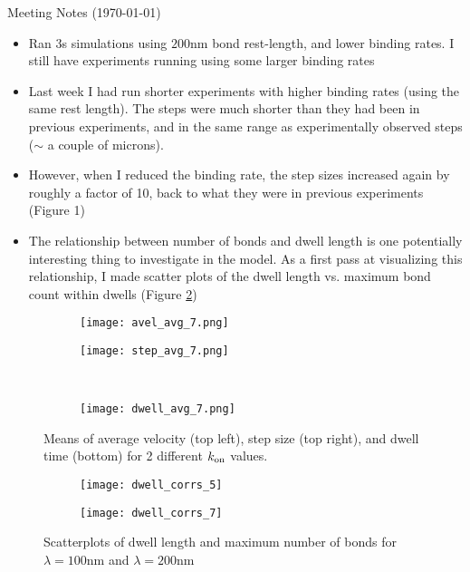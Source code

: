 \documentclass{article}
\newcommand{\tn}{\textnormal}
\begin{document}
\pagestyle{plain}

\begin{center}
  {\Large Meeting Notes (\today)}
\end{center}

\begin{itemize}
\item Ran 3s simulations using $200 \text{nm}$ bond rest-length, and
  lower binding rates. I still have experiments running using some
  larger binding rates
\item Last week I had run shorter experiments with higher binding
  rates (using the same rest length). The steps were much shorter than
  they had been in previous experiments, and in the same range as
  experimentally observed steps ($\sim$ a couple of microns). 
\item However, when I reduced the binding rate, the step sizes
  increased again by roughly a factor of 10, back to what they were in
  previous experiments (Figure 1)
\item The relationship between number of bonds and dwell length is one
  potentially interesting thing to investigate in the model. As a
  first pass at visualizing this relationship, I made scatter plots of
  the dwell length vs. maximum bond count within dwells (Figure
  \ref{fig:dwell-corr})
\end{itemize}

\begin{figure}[h]
  \centering
  \begin{subfigure}{0.49\textwidth}
    \texttt{[image: avel\_avg\_7.png]}
  \end{subfigure}
  \hfill
  \begin{subfigure}{0.49\textwidth}
    \texttt{[image: step\_avg\_7.png]}
  \end{subfigure}
  \\
  \begin{subfigure}{0.49\textwidth}
    \texttt{[image: dwell\_avg\_7.png]}
  \end{subfigure}
  \label{fig:stats}
  \caption{Means of average velocity (top left), step size (top
    right), and dwell time (bottom) for 2 different $k_\tn{on}$
    values.}
\end{figure}

\begin{figure}[h]
  \centering
  \begin{subfigure}{0.49\textwidth}
    \texttt{[image: dwell\_corrs\_5]}
  \end{subfigure}
  \hfill
  \begin{subfigure}{0.49\textwidth}
    \texttt{[image: dwell\_corrs\_7]}
  \end{subfigure}
  \caption{Scatterplots of dwell length and maximum number of bonds
    for $\lambda = 100 \text{nm}$ and $\lambda = 200 \text{nm}$}
    \label{fig:dwell-corr}
\end{figure}

% 
% 
\end{document}
